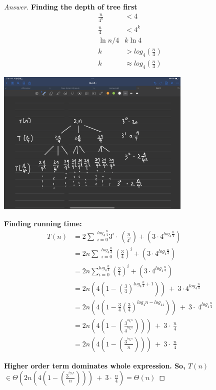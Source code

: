 \documentclass[11pt]{article}
\theoremstyle{definition}
\theoremstyle{definition}
\theoremstyle{definition}
\begin{document}
\begin{proof}[Answer]
\textbf{Finding the depth of tree first}
\begin{align*}
\frac{n}{4^k} &< 4\\
\frac{n}{4} &< 4^k\\
\ln{n/4} &k\ln{4}\\
k &> log_4(\frac{n}{4})\\
k &\approx log_4(\frac{n}{4})
\end{align*}

\begin{center}
\includegraphics[width=0.7\textwidth]{IMG_0504.PNG}
\end{center}

\textbf{Finding running time:\\}
\begin{align*}
T(n) &= 2\sum \:_{i=0}^{log_4\frac{n}{4}}3^i\cdot \:\left(\frac{n}{4^i}\right) + (3\cdot 4^{log_4\frac{n}{4}})\\
&=2n\sum \:_{i=0}^{log_4\frac{n}{4}}\:\left(\frac{3}{4}\right)^i + (3\cdot 4^{log_4\frac{n}{4}})\\
&= 2n\sum _{i=0}^{log_4\frac{n}{4}}\left(\frac{3}{4}\right)^i + (3\cdot 4^{log_4\frac{n}{4}})\\
&= 2n\left(4\left(1-\left(\frac{3}{4}\right)^{log_4\frac{n}{4}+1}\right)\right)\:+\:3\cdot 4^{log_4\frac{n}{4}}\\
&= 2n\left(4\left(1-\frac{3}{4}\left(\frac{3}{4}\right)^{log_4n-log_44}\right)\right)\:+\:3\cdot \:4^{log_4\frac{n}{4}}\\
&= 2n\left(4\left(1-\left(\frac{3^{^{log_4n}}}{4^{^{log_4n}}}\right)\right)\right)\:+\:3\cdot \:\frac{n}{4}\\
&= 2n\left(4\left(1-\left(\frac{3^{^{log_4n}}}{n}\right)\right)\right)\:+\:3\cdot \:\frac{n}{4}
\end{align*}

\textbf{Higher order term dominates whole expression. So, $T(n)$ $\in \Theta(2n\left(4\left(1-\left(\frac{3^{^{log_4n}}}{n}\right)\right)\right)\:+\:3\cdot \:\frac{n}{4}) = \Theta(n)$} 
\end{proof}




\end{document}
